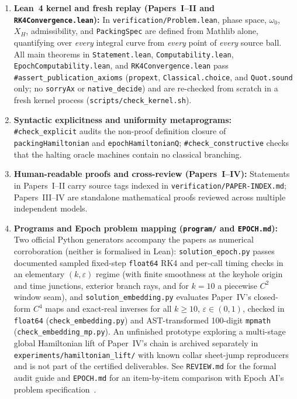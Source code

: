 \documentclass[11pt]{amsart}
\newcommand{\eps}{\varepsilon}
\begin{document}
\begin{enumerate}[label=\textbf{\arabic*.},leftmargin=1.8em]
\item \textbf{Lean~4 kernel and fresh replay (Papers~I--II and \texttt{RK4Convergence.lean}):}
In \texttt{verification/\allowbreak Problem.lean}, phase space, $\omega_0$, $X_H$, admissibility, and
\texttt{PackingSpec} are defined from Mathlib alone, quantifying over \emph{every} integral curve from \emph{every}
point of \emph{every} source ball. All main theorems in \texttt{Statement.lean}, \texttt{Computability.lean},
\texttt{Epoch\allowbreak Computability.lean}, and \texttt{RK4\allowbreak Convergence.lean} pass
\texttt{\#assert\_\allowbreak publication\_\allowbreak axioms} (\texttt{propext}, \texttt{Classical.choice}, and
\texttt{Quot.sound} only; no \texttt{sorryAx} or \texttt{native\_decide}) and are re-checked from scratch in a fresh
kernel process (\texttt{scripts/\allowbreak check\_\allowbreak kernel.sh}).
\item \textbf{Syntactic explicitness and uniformity metaprograms:} \texttt{\#check\_\allowbreak explicit} audits the
non-proof definition closure of \texttt{packingHamiltonian} and \texttt{epochHamiltonianQ};
\texttt{\#check\_\allowbreak constructive} checks that the halting oracle machines contain no classical branching.
\item \textbf{Human-readable proofs and cross-review (Papers~I--IV):} Statements in Papers~I--II carry source tags
indexed in \texttt{verification/\allowbreak PAPER-INDEX.md}; Papers~III--IV are standalone mathematical proofs reviewed
across multiple independent models.
\item \textbf{Programs and Epoch problem mapping (\texttt{program/} and \texttt{EPOCH.md}):} Two official Python
generators accompany the papers as numerical corroboration (neither is formalised in Lean):
\texttt{solution\_\allowbreak epoch.py} passes documented sampled fixed-step \texttt{float64} RK4 and per-call timing
checks in an elementary $(k,\eps)$ regime (with finite smoothness at the keyhole origin and time junctions, exterior
branch rays, and for $k=10$ a piecewise $C^2$ window seam), and
\texttt{solution\_\allowbreak embedding.py} evaluates Paper~IV's closed-form $C^4$ maps and exact-real inverses for all
$k\ge10$, $\eps\in(0,1)$, checked in \texttt{float64} (\texttt{check\_\allowbreak embedding.py}) and AST-transformed
100-digit \texttt{mpmath} (\texttt{check\_\allowbreak embedding\_\allowbreak mp.py}). An unfinished prototype exploring
a multi-stage global Hamiltonian lift of Paper~IV's chain is archived separately in
\texttt{experiments/\allowbreak hamiltonian\_\allowbreak lift/} with known collar sheet-jump reproducers and is not part
of the certified deliverables. See \texttt{REVIEW.md} for the formal audit guide and \texttt{EPOCH.md} for an
item-by-item comparison with Epoch AI's problem specification~\cite{Epoch}.
\end{enumerate}
\end{document}

